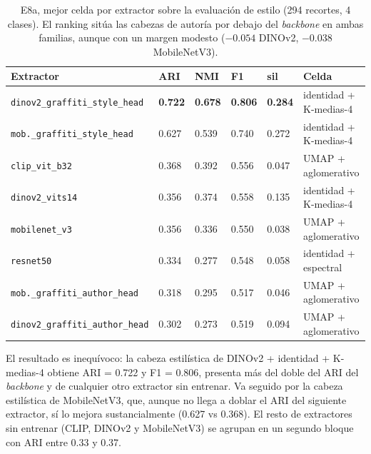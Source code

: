 \begin{table}[h]
\caption[E8a, mejor celda por extractor (estilo)]{E8a, mejor celda por extractor sobre la evaluación de estilo (294
recortes, 4 clases). El ranking sitúa las cabezas de autoría por debajo del
\textit{backbone} en ambas familias, aunque con un margen modesto
($-0.054$ DINOv2, $-0.038$ MobileNetV3).}
\label{tab:e8a-best}
\centering
{\footnotesize
\begin{tabular}{|p{4.4cm}|p{0.7cm}|p{0.7cm}|p{0.7cm}|p{0.7cm}|p{3.0cm}|} \hline
  \textbf{Extractor} & \textbf{ARI} & \textbf{NMI} & \textbf{F1} & \textbf{sil} & \textbf{Celda} \\ \hline
  \texttt{dinov2\_graffiti\_style\_head}      & \textbf{0.722} & \textbf{0.678} & \textbf{0.806} & \textbf{0.284} & identidad + K-medias-4   \\ \hline
  \texttt{mob.\_graffiti\_style\_head}        & 0.627 & 0.539 & 0.740 & 0.272 & identidad + K-medias-4   \\ \hline
  \texttt{clip\_vit\_b32}                     & 0.368 & 0.392 & 0.556 & 0.047 & UMAP + aglomerativo    \\ \hline
  \texttt{dinov2\_vits14}                     & 0.356 & 0.374 & 0.558 & 0.135 & identidad + K-medias-4   \\ \hline
  \texttt{mobilenet\_v3}                      & 0.356 & 0.336 & 0.550 & 0.038 & UMAP + aglomerativo    \\ \hline
  \texttt{resnet50}                           & 0.334 & 0.277 & 0.548 & 0.058 & identidad + espectral  \\ \hline
  \texttt{mob.\_graffiti\_author\_head}       & 0.318 & 0.295 & 0.517 & 0.046 & UMAP + aglomerativo    \\ \hline
  \texttt{dinov2\_graffiti\_author\_head}     & 0.302 & 0.273 & 0.519 & 0.094 & UMAP + aglomerativo    \\ \hline
\end{tabular}
}
\end{table}

El resultado es inequívoco: la cabeza estilística de DINOv2 + identidad +
K-medias-4 obtiene ARI = 0.722 y F1 = 0.806, presenta más del doble del ARI del
\textit{backbone} y de cualquier otro extractor sin entrenar. Va seguido por la
cabeza estilística de MobileNetV3, que, aunque no llega a doblar el ARI del
siguiente extractor, sí lo mejora sustancialmente (0.627 vs 0.368). El resto de
extractores sin entrenar (CLIP, DINOv2 y MobileNetV3) se agrupan en un segundo
bloque con ARI entre 0.33 y 0.37.

